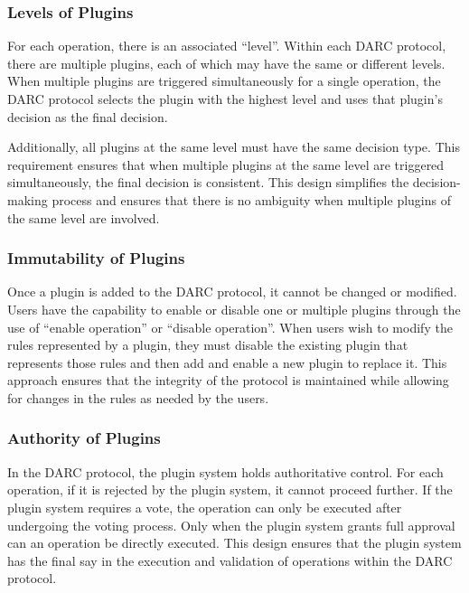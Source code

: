 \documentclass[main.tex]{subfiles}
\begin{document}
\subsubsection{Levels of Plugins}

For each operation, there is an associated ``level''. Within each DARC protocol, there are multiple plugins, each of which may have the same or different levels. When multiple plugins are triggered simultaneously for a single operation, the DARC protocol selects the plugin with the highest level and uses that plugin's decision as the final decision.

Additionally, all plugins at the same level must have the same decision type. This requirement ensures that when multiple plugins at the same level are triggered simultaneously, the final decision is consistent. This design simplifies the decision-making process and ensures that there is no ambiguity when multiple plugins of the same level are involved.

\subsubsection{Immutability of Plugins}

Once a plugin is added to the DARC protocol, it cannot be changed or modified. Users have the capability to enable or disable one or multiple plugins through the use of ``enable operation'' or ``disable operation''.  When users wish to modify the rules represented by a plugin, they must disable the existing plugin that represents those rules and then add and enable a new plugin to replace it. This approach ensures that the integrity of the protocol is maintained while allowing for changes in the rules as needed by the users.

\subsubsection{Authority of Plugins}

In the DARC protocol, the plugin system holds authoritative control. For each operation, if it is rejected by the plugin system, it cannot proceed further. If the plugin system requires a vote, the operation can only be executed after undergoing the voting process. Only when the plugin system grants full approval can an operation be directly executed. This design ensures that the plugin system has the final say in the execution and validation of operations within the DARC protocol.
\end{document}
